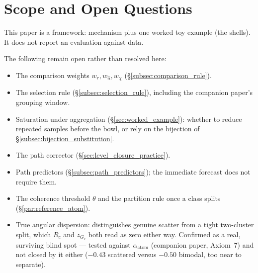 \documentclass[12pt, a4paper]{article}
\begin{document}
\section{Scope and Open Questions}
\label{sec:scope}

This paper is a framework: mechanism plus one worked toy example
(the shells). It does not report an evaluation against data.

The following remain open rather than resolved here:

\begin{itemize}
\item The comparison weights $w_r,w_{\hat n},w_\chi$
      (\S\ref{subsec:comparison_rule}).
\item The selection rule (\S\ref{subsec:selection_rule}), including
      the companion paper's grouping window.
\item Saturation under aggregation (\S\ref{sec:worked_example}):
      whether to reduce repeated samples before the bowl, or rely on
      the bijection of \S\ref{subsec:bijection_substitution}.
\item The path corrector (\S\ref{sec:level_closure_practice}).
\item Path predictors (\S\ref{subsec:path_predictors}); the immediate
      forecast does not require them.
\item The coherence threshold $\theta$ and the partition rule once a
      class splits (\S\ref{par:reference_atom}).
\item True angular dispersion: distinguishes genuine scatter from a
      tight two-cluster split, which $\bar R_c$ and $z_{G_c}$ both
      read as zero either way. Confirmed as a real, surviving blind
      spot --- tested against $\alpha_{\text{atom}}$ (companion
      paper, Axiom~7) and not closed by it either ($-0.43$ scattered
      versus $-0.50$ bimodal, too near to separate).
\end{itemize}
\end{document}
